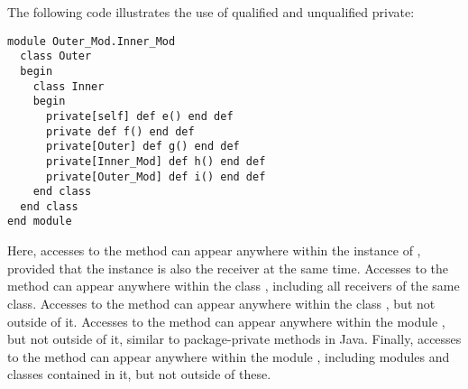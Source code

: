 \begin{itemize}
\example The following code illustrates the use of qualified and unqualified private: 
\begin{lstlisting}
module Outer_Mod.Inner_Mod
  class Outer
  begin
    class Inner
    begin
      private[self] def e() end def
      private def f() end def
      private[Outer] def g() end def
      private[Inner_Mod] def h() end def
      private[Outer_Mod] def i() end def
    end class
  end class
end module
\end{lstlisting}
Here, accesses to the method  can appear anywhere within the instance of , provided that the instance is also the receiver at the same time. Accesses to the method  can appear anywhere within the class , including all receivers of the same class. Accesses to the method  can appear anywhere within the class , but not outside of it. Accesses to the method  can appear anywhere within the module , but not outside of it, similar to package-private methods in Java. Finally, accesses to the method  can appear anywhere within the module , including modules and classes contained in it, but not outside of these.

\end{itemize}

